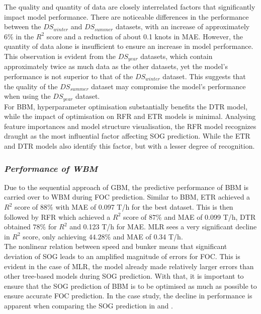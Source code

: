 The quality and quantity of data are closely interrelated factors that significantly impact model performance. There are noticeable differences in the performance between the $DS_{winter}$ and $DS_{summer}$ datasets, with an increase of approximately $6\%$ in the $R^2$ score and a reduction of about 0.1 knots in MAE. However, the quantity of data alone is insufficient to ensure an increase in model performance. This observation is evident from the $DS_{year}$ datasets, which contain approximately twice as much data as the other datasets, yet the model's performance is not superior to that of the $DS_{winter}$ dataset. This suggests that the quality of the $DS_{summer}$ dataset may compromise the model's performance when using the $DS_{year}$ dataset.\\

For BBM, hyperparameter optimisation substantially benefits the DTR model, while the impact of optimisation on RFR and ETR models is minimal. Analysing feature importances and model structure visualisation, the RFR model recognizes draught as the most influential factor affecting SOG prediction. While the ETR and DTR models also identify this factor, but with a lesser degree of recognition.\\

\subsubsection*{\emph{Performance of WBM}}


Due to the sequential approach of GBM, the predictive performance of BBM is carried over to WBM during FOC prediction. Similar to BBM, ETR achieved a $R^2$ score of $88\%$ with MAE of 0.097 T/h for the best dataset. This is then followed by RFR which achieved a $R^2$ score of $87\%$ and MAE of 0.099 T/h, DTR obtained $78\%$ for $R^2$ and 0.123 T/h for MAE. MLR sees a very significant decline in $R^2$ score, only achieving $44.28\%$ and MAE of 0.34 T/h.\\

The nonlinear relation between speed and bunker means that significant deviation of SOG leads to an amplified magnitude of errors for FOC. This is evident in the case of MLR, the model already made relatively larger errors than other tree-based models during SOG prediction. With that, it is important to ensure that the SOG prediction of BBM is to be optimised as much as possible to ensure accurate FOC prediction. In the case study, the decline in performance is apparent when comparing the SOG prediction in  and .\\

